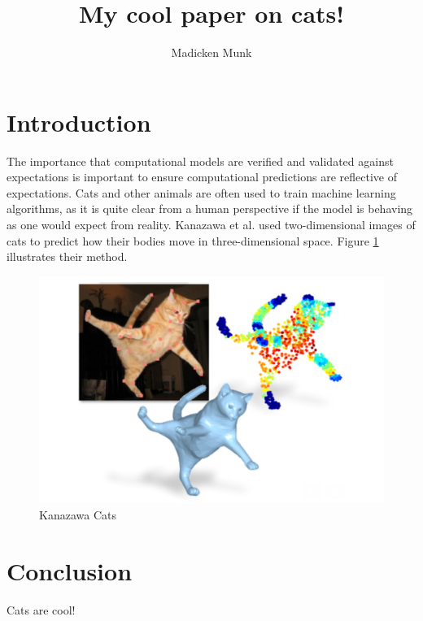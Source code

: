 \documentclass{article}
\title{My cool paper on cats!}
\author{Madicken Munk}
\begin{document}
\maketitle

\section{Introduction}
The importance that computational models are verified and validated against
expectations is important to ensure computational predictions are reflective of
expectations. Cats and other animals are often used to train machine learning
algorithms, as it is quite clear from a human perspective if the model is
behaving as one would expect from reality. Kanazawa et al.
\cite{kanazawa_learning_2015} used two-dimensional images of cats to predict how
their bodies move in three-dimensional space. Figure \ref{fig:2dto3dcat}
illustrates their method.


\begin{figure}[h!]
  \centering
  \includegraphics[scale=0.2]{figures/Kanazawa2016}
  \caption{Kanazawa Cats}
  \label{fig:2dto3dcat}
\end{figure}

\section{Conclusion}
Cats are cool!



\end{document}
